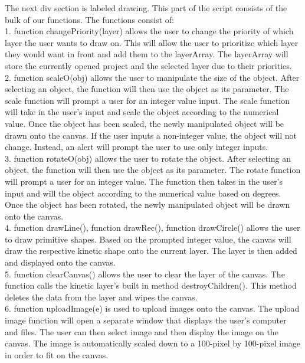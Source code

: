 \documentclass[a4paper, 11pt]{article} %
\begin{document}
The next div section is labeled drawing. This part of the script consists of the bulk of our functions. The functions consist of:\\

1.	function changePriority(layer) allows the user to change the priority of which layer the user wants to draw on. This will allow the user to prioritize which layer they would want in front and add them to the layerArray. The layerArray will store the currently opened project and the selected layer due to their priorities.\\

2.	function scaleO(obj) allows the user to manipulate the size of the object. After selecting an object, the function will then use the object as its parameter. The scale function will prompt a user for an integer value input. The scale function will take in the user’s input and scale the object according to the numerical value. Once the object has been scaled, the newly manipulated object will be drawn onto the canvas. If the user inputs a non-integer value, the object will not change. Instead, an alert will prompt the user to use only integer inputs.\\


3.	function rotateO(obj) allows the user to rotate the object. After selecting an object, the function will then use the object as its parameter. The rotate function will prompt a user for an integer value. The function then takes in the user’s input and will the object according to the numerical value based on degrees. Once the object has been rotated, the newly manipulated object will be drawn onto the canvas.\\

4.	function drawLine(), function drawRec(), function drawCircle() allows the user to draw primitive shapes. Based on the prompted integer value, the canvas will draw the respective kinetic shape onto the current layer. The layer is then added and displayed onto the canvas.\\


5.	function clearCanvas() allows the user to clear the layer of the canvas. The function calls the kinetic layer’s built in method destroyChildren(). This method deletes the data from the layer and wipes the canvas.\\

6.	function uploadImage(e) is used to upload images onto the canvas. The upload image function will open a separate window that displays the user’s computer and files. The user can then select image and then display the image on the canvas. The image is automatically scaled down to a 100-pixel by 100-pixel image in order to fit on the canvas. \\
\end{document}
